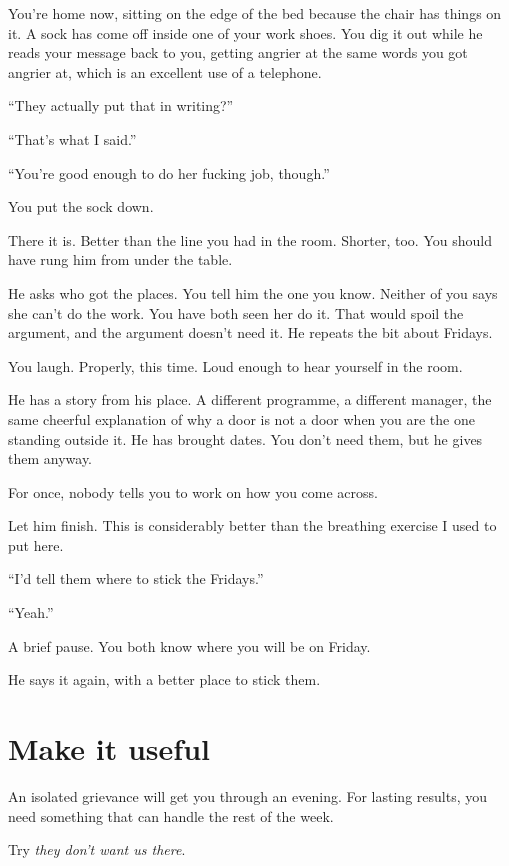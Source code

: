 \documentclass[11pt,oneside]{book}
\begin{document}
You're home now, sitting on the edge of the bed because the chair has things on it. A sock has come off inside one of your work shoes. You dig it out while he reads your message back to you, getting angrier at the same words you got angrier at, which is an excellent use of a telephone.

``They actually put that in writing?''

``That's what I said.''

``You're good enough to do her fucking job, though.''

You put the sock down.

There it is. Better than the line you had in the room. Shorter, too. You should have rung him from under the table.

He asks who got the places. You tell him the one you know. Neither of you says she can't do the work. You have both seen her do it. That would spoil the argument, and the argument doesn't need it. He repeats the bit about Fridays.

You laugh. Properly, this time. Loud enough to hear yourself in the room.

He has a story from his place. A different programme, a different manager, the same cheerful explanation of why a door is not a door when you are the one standing outside it. He has brought dates. You don't need them, but he gives them anyway.

For once, nobody tells you to work on how you come across.

Let him finish. This is considerably better than the breathing exercise I used to put here.

``I'd tell them where to stick the Fridays.''

``Yeah.''

A brief pause. You both know where you will be on Friday.

He says it again, with a better place to stick them.

\section*{Make it useful}

An isolated grievance will get you through an evening. For lasting results, you need something that can handle the rest of the week.

Try \emph{they don't want us there}.
\end{document}
